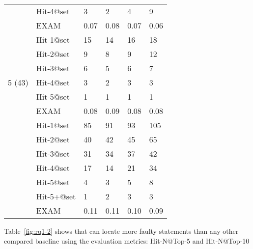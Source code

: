 \begin{table}[t]
{\begin{center}
\begin{tabular}{p{0.8cm}<{\centering}|p{1.33cm}<{\centering}|p{1cm}<{\centering}|p{0.7cm}<{\centering}|p{1cm}<{\centering}|p{1cm}<{\centering}}
										& Hit-4@set     & 3 & 2 & 4 & 9 \\
										& EXAM          & 0.07 & 0.08 & 0.07 & 0.06 \\
				\hline
				\multirow{7}{*}{5 (43)}  & Hit-1@set     & 15 & 14 & 16 & 18 \\
										& Hit-2@set     & 9 & 8 & 9 & 12 \\
										& Hit-3@set     & 6 & 5 & 6 & 7 \\
										& Hit-4@set     & 3 & 2 & 3 & 3 \\
										& Hit-5@set     & 1 & 1 & 1 & 1 \\
										& EXAM          & 0.08 & 0.09 & 0.08 & 0.08 \\
				\hline
				\multirow{8}{*}{5+ (283)}  & Hit-1@set     & 85 & 91 & 93 & 105 \\
								 		& Hit-2@set     & 40 & 42 & 45 & 65 \\
										& Hit-3@set     & 31 & 34 & 37 & 42 \\
								 		& Hit-4@set     & 17 & 14 & 21 & 34 \\
										& Hit-5@set     & 4 & 3 & 5 & 8 \\
										& Hit-5+@set    & 1 & 2 & 3 & 3 \\
										& EXAM          & 0.11 & 0.11 & 0.10 & 0.09 \\
				\hline
			\end{tabular}
			
			\label{fig:rq1-1}
		\end{center}
	}
\end{table}





Table~\ref{fig:rq1-2} shows that {\tool} can locate more faulty statements than any other compared baseline using the evaluation metrics: Hit-N@Top-5 and Hit-N@Top-10

